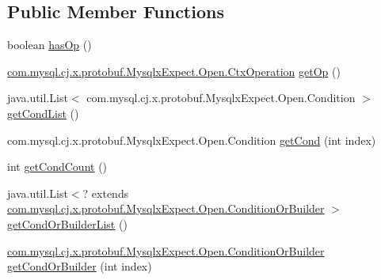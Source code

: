 \subsection*{Public Member Functions}
\begin{DoxyCompactItemize}
\item 
boolean \mbox{\hyperlink{interfacecom_1_1mysql_1_1cj_1_1x_1_1protobuf_1_1_mysqlx_expect_1_1_open_or_builder_a173f6467d5e57ac44c7606a9895c3fe1}{has\+Op}} ()
\item 
\mbox{\hyperlink{enumcom_1_1mysql_1_1cj_1_1x_1_1protobuf_1_1_mysqlx_expect_1_1_open_1_1_ctx_operation}{com.\+mysql.\+cj.\+x.\+protobuf.\+Mysqlx\+Expect.\+Open.\+Ctx\+Operation}} \mbox{\hyperlink{interfacecom_1_1mysql_1_1cj_1_1x_1_1protobuf_1_1_mysqlx_expect_1_1_open_or_builder_aeffe46569c0db5b8576ff0d12af43f11}{get\+Op}} ()
\item 
java.\+util.\+List$<$ com.\+mysql.\+cj.\+x.\+protobuf.\+Mysqlx\+Expect.\+Open.\+Condition $>$ \mbox{\hyperlink{interfacecom_1_1mysql_1_1cj_1_1x_1_1protobuf_1_1_mysqlx_expect_1_1_open_or_builder_af270ee99a6bee2ff56cc310d0336b2c7}{get\+Cond\+List}} ()
\item 
com.\+mysql.\+cj.\+x.\+protobuf.\+Mysqlx\+Expect.\+Open.\+Condition \mbox{\hyperlink{interfacecom_1_1mysql_1_1cj_1_1x_1_1protobuf_1_1_mysqlx_expect_1_1_open_or_builder_aab03dab73287beab194c7999a8a9ab09}{get\+Cond}} (int index)
\item 
int \mbox{\hyperlink{interfacecom_1_1mysql_1_1cj_1_1x_1_1protobuf_1_1_mysqlx_expect_1_1_open_or_builder_a5f25b3f0acfea74f95f8fb33d72a524f}{get\+Cond\+Count}} ()
\item 
java.\+util.\+List$<$? extends \mbox{\hyperlink{interfacecom_1_1mysql_1_1cj_1_1x_1_1protobuf_1_1_mysqlx_expect_1_1_open_1_1_condition_or_builder}{com.\+mysql.\+cj.\+x.\+protobuf.\+Mysqlx\+Expect.\+Open.\+Condition\+Or\+Builder}} $>$ \mbox{\hyperlink{interfacecom_1_1mysql_1_1cj_1_1x_1_1protobuf_1_1_mysqlx_expect_1_1_open_or_builder_aca7735cb02c53240e8a4f631dc67fe3a}{get\+Cond\+Or\+Builder\+List}} ()
\item 
\mbox{\hyperlink{interfacecom_1_1mysql_1_1cj_1_1x_1_1protobuf_1_1_mysqlx_expect_1_1_open_1_1_condition_or_builder}{com.\+mysql.\+cj.\+x.\+protobuf.\+Mysqlx\+Expect.\+Open.\+Condition\+Or\+Builder}} \mbox{\hyperlink{interfacecom_1_1mysql_1_1cj_1_1x_1_1protobuf_1_1_mysqlx_expect_1_1_open_or_builder_ae3f5b98cfb7053c1631aad75b549ea56}{get\+Cond\+Or\+Builder}} (int index)
\end{DoxyCompactItemize}


